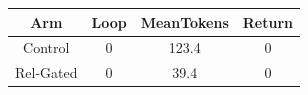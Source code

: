 \begin{table}[h]
\centering
\begin{tabular}{ |c|c|c|c| }
\hline
Arm & Loop & MeanTokens & Return \\
\hline
Control & 0 & 123.4 & 0 \\
\hline
Rel-Gated & 0 & 39.4 & 0 \\
\hline
\end{tabular}
\end{table}
